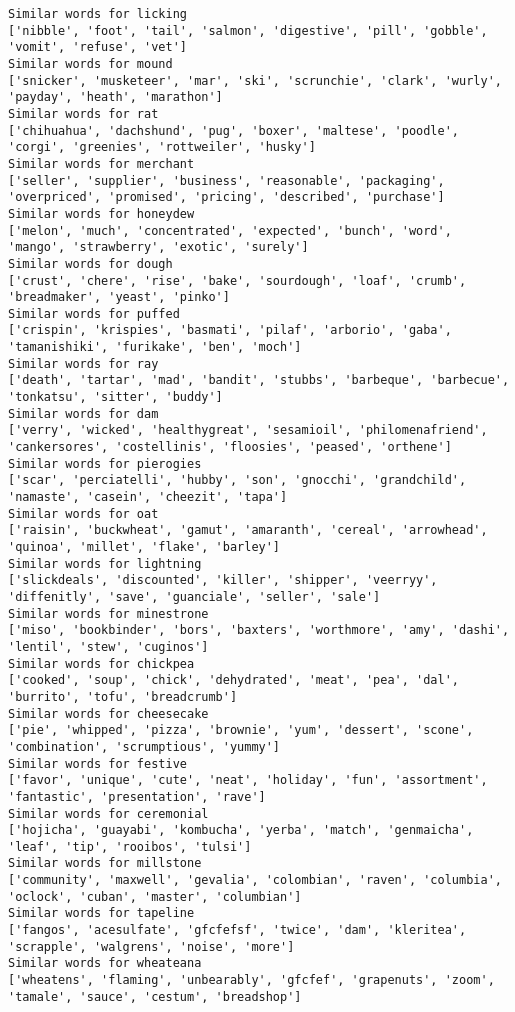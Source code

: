 \documentclass[11pt]{article}
\begin{document}
\begin{Verbatim}[commandchars=\\\{\}]
Similar words for licking
['nibble', 'foot', 'tail', 'salmon', 'digestive', 'pill', 'gobble', 'vomit', 'refuse', 'vet']
Similar words for mound
['snicker', 'musketeer', 'mar', 'ski', 'scrunchie', 'clark', 'wurly', 'payday', 'heath', 'marathon']
Similar words for rat
['chihuahua', 'dachshund', 'pug', 'boxer', 'maltese', 'poodle', 'corgi', 'greenies', 'rottweiler', 'husky']
Similar words for merchant
['seller', 'supplier', 'business', 'reasonable', 'packaging', 'overpriced', 'promised', 'pricing', 'described', 'purchase']
Similar words for honeydew
['melon', 'much', 'concentrated', 'expected', 'bunch', 'word', 'mango', 'strawberry', 'exotic', 'surely']
Similar words for dough
['crust', 'chere', 'rise', 'bake', 'sourdough', 'loaf', 'crumb', 'breadmaker', 'yeast', 'pinko']
Similar words for puffed
['crispin', 'krispies', 'basmati', 'pilaf', 'arborio', 'gaba', 'tamanishiki', 'furikake', 'ben', 'moch']
Similar words for ray
['death', 'tartar', 'mad', 'bandit', 'stubbs', 'barbeque', 'barbecue', 'tonkatsu', 'sitter', 'buddy']
Similar words for dam
['verry', 'wicked', 'healthygreat', 'sesamioil', 'philomenafriend', 'cankersores', 'costellinis', 'floosies', 'peased', 'orthene']
Similar words for pierogies
['scar', 'perciatelli', 'hubby', 'son', 'gnocchi', 'grandchild', 'namaste', 'casein', 'cheezit', 'tapa']
Similar words for oat
['raisin', 'buckwheat', 'gamut', 'amaranth', 'cereal', 'arrowhead', 'quinoa', 'millet', 'flake', 'barley']
Similar words for lightning
['slickdeals', 'discounted', 'killer', 'shipper', 'veerryy', 'diffenitly', 'save', 'guanciale', 'seller', 'sale']
Similar words for minestrone
['miso', 'bookbinder', 'bors', 'baxters', 'worthmore', 'amy', 'dashi', 'lentil', 'stew', 'cuginos']
Similar words for chickpea
['cooked', 'soup', 'chick', 'dehydrated', 'meat', 'pea', 'dal', 'burrito', 'tofu', 'breadcrumb']
Similar words for cheesecake
['pie', 'whipped', 'pizza', 'brownie', 'yum', 'dessert', 'scone', 'combination', 'scrumptious', 'yummy']
Similar words for festive
['favor', 'unique', 'cute', 'neat', 'holiday', 'fun', 'assortment', 'fantastic', 'presentation', 'rave']
Similar words for ceremonial
['hojicha', 'guayabi', 'kombucha', 'yerba', 'match', 'genmaicha', 'leaf', 'tip', 'rooibos', 'tulsi']
Similar words for millstone
['community', 'maxwell', 'gevalia', 'colombian', 'raven', 'columbia', 'oclock', 'cuban', 'master', 'columbian']
Similar words for tapeline
['fangos', 'acesulfate', 'gfcfefsf', 'twice', 'dam', 'kleritea', 'scrapple', 'walgrens', 'noise', 'more']
Similar words for wheateana
['wheatens', 'flaming', 'unbearably', 'gfcfef', 'grapenuts', 'zoom', 'tamale', 'sauce', 'cestum', 'breadshop']

\end{Verbatim}
\end{document}
